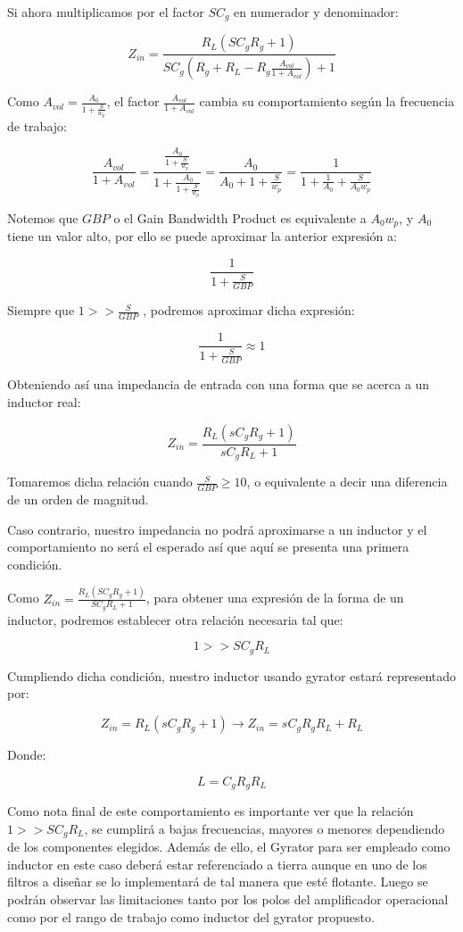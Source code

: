 Si ahora multiplicamos por el factor $SC_g$ en numerador y denominador:

$$Z_{in}=\frac{R_L(SC_gR_g+1)}{SC_g(R_g+R_L-R_g\frac{A_{vol}}{1+A_{vol}})+1}$$

Como $A_{vol}=\frac{A_0}{1+\frac{S}{w_p}}$, el factor $\frac{A_{vol}}{1+A_{vol}}$ cambia su comportamiento
según la frecuencia de trabajo:

$$\frac{A_{vol}}{1+A_{vol}}=\frac{\frac{A_0}{1+\frac{S}{w_p}}}{1+\frac{A_0}{1+\frac{S}{w_p}}}=
\frac{A_0}{A_0+1+\frac{S}{w_p}}=\frac{1}{1+\frac{1}{A_0}+\frac{S}{A_0w_p}}$$

Notemos que $GBP$ o el Gain Bandwidth Product es equivalente a $A_0w_p$, y $A_0$ tiene un valor alto, por ello se puede aproximar la anterior
expresión a:

$$\frac{1}{1+\frac{S}{GBP}}$$

Siempre que $1 >> \frac{S}{GBP}$ , podremos aproximar dicha expresión:

$$\frac{1}{1+\frac{S}{GBP}} \approx 1$$

Obteniendo así una impedancia de entrada con una forma que se acerca a un inductor real:

$$Z_{in}=\frac{R_L(sC_gR_g+1)}{sC_gR_L+1}$$

Tomaremos dicha relación cuando $\frac{S}{GBP} \geq 10$, o equivalente a decir una diferencia de un orden de magnitud.

Caso contrario, nuestro impedancia no podrá aproximarse a un inductor y el comportamiento no será el esperado así que aquí se presenta 
una primera condición.

Como $Z_{in}=\frac{R_L(SC_gR_g+1)}{SC_gR_L+1}$, para obtener una expresión de la forma de un inductor,
podremos establecer otra relación necesaria tal que:

$$1 >> SC_gR_L$$

Cumpliendo dicha condición, nuestro inductor usando gyrator estará representado por:

$$Z_{in}=R_L(sC_gR_g+1)\longrightarrow Z_{in}=sC_gR_gR_L+R_L$$

Donde:

$$L=C_gR_gR_L$$

Como nota final de este comportamiento es importante ver que la relación $1 >> SC_gR_L$, se cumplirá a bajas frecuencias,
mayores o menores dependiendo de los componentes elegidos. Además de ello, el Gyrator para ser empleado como inductor en este caso deberá estar
referenciado a tierra aunque en uno de los filtros a diseñar se lo implementará de tal manera que esté flotante. Luego se podrán observar las limitaciones
tanto por los polos del amplificador operacional como por el rango de trabajo como inductor del gyrator propuesto. 



